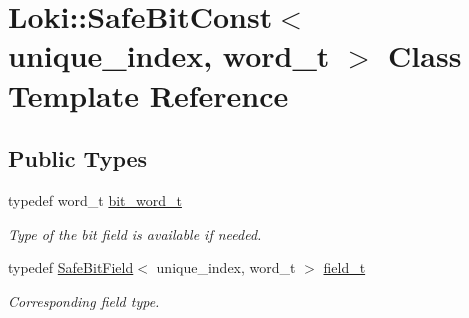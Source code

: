\hypertarget{classLoki_1_1SafeBitConst}{}\section{Loki\+:\+:Safe\+Bit\+Const$<$ unique\+\_\+index, word\+\_\+t $>$ Class Template Reference}
\label{classLoki_1_1SafeBitConst}
\subsection*{Public Types}
\begin{DoxyCompactItemize}
\item 
\hypertarget{classLoki_1_1SafeBitConst_a2b7673100bcc441e25b2a63c1ad8ca79}{}typedef word\+\_\+t \hyperlink{classLoki_1_1SafeBitConst_a2b7673100bcc441e25b2a63c1ad8ca79}{bit\+\_\+word\+\_\+t}\label{classLoki_1_1SafeBitConst_a2b7673100bcc441e25b2a63c1ad8ca79}

\begin{DoxyCompactList}\small\item\em Type of the bit field is available if needed. \end{DoxyCompactList}\item 
\hypertarget{classLoki_1_1SafeBitConst_afc37803aa81f3704a2cef0ece9e8948c}{}typedef \hyperlink{classLoki_1_1SafeBitField}{Safe\+Bit\+Field}$<$ unique\+\_\+index, word\+\_\+t $>$ \hyperlink{classLoki_1_1SafeBitConst_afc37803aa81f3704a2cef0ece9e8948c}{field\+\_\+t}\label{classLoki_1_1SafeBitConst_afc37803aa81f3704a2cef0ece9e8948c}

\begin{DoxyCompactList}\small\item\em Corresponding field type. \end{DoxyCompactList}\end{DoxyCompactItemize}
